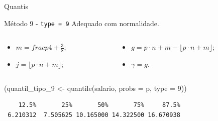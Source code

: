 \documentclass[
  10pt,
  ignorenonframetext,
]{beamer}
\newenvironment{Shaded}{\begin{snugshade}}{\end{snugshade}}
\newcommand{\AttributeTok}[1]{\textcolor[rgb]{0.40,0.45,0.13}{#1}}
\newcommand{\DecValTok}[1]{\textcolor[rgb]{0.68,0.00,0.00}{#1}}
\newcommand{\FunctionTok}[1]{\textcolor[rgb]{0.28,0.35,0.67}{#1}}
\newcommand{\NormalTok}[1]{\textcolor[rgb]{0.00,0.23,0.31}{#1}}
\newcommand{\OtherTok}[1]{\textcolor[rgb]{0.00,0.23,0.31}{#1}}
\providecommand{\tightlist}{%
  \setlength{\itemsep}{0pt}\setlength{\parskip}{0pt}}\usepackage{longtable,booktabs,array}
\begin{document}
\begin{frame}[fragile]{Quantis}
\protect\hypertarget{quantis-6}{}
\begin{block}{Método 9 - \texttt{type\ =\ 9}}
\protect\hypertarget{muxe9todo-9---type-9}{}
Adequado com normalidade.

\begin{columns}[T]
\begin{column}{0.3\textwidth}
\begin{itemize}
\tightlist
\item
  \(m=frac{p}{4}+\frac{3}{8}\);
\item
  \(j=\lfloor p\cdot n + m \rfloor\);
\end{itemize}
\end{column}

\begin{column}{0.7\textwidth}
\begin{itemize}
\tightlist
\item
  \(g = p\cdot n + m- \lfloor p\cdot n+m \rfloor\);
\item
  \(\gamma = g\).
\end{itemize}
\end{column}
\end{columns}

\begin{Shaded}
\begin{Highlighting}[]
\NormalTok{(quantil\_tipo\_9 }\OtherTok{\textless{}{-}} \FunctionTok{quantile}\NormalTok{(salario, }\AttributeTok{probs =}\NormalTok{ p, }\AttributeTok{type =} \DecValTok{9}\NormalTok{))}
\end{Highlighting}
\end{Shaded}

\begin{verbatim}
    12.5%       25%       50%       75%     87.5% 
 6.210312  7.505625 10.165000 14.322500 16.670938 
\end{verbatim}
\end{block}
\end{frame}
\end{document}
